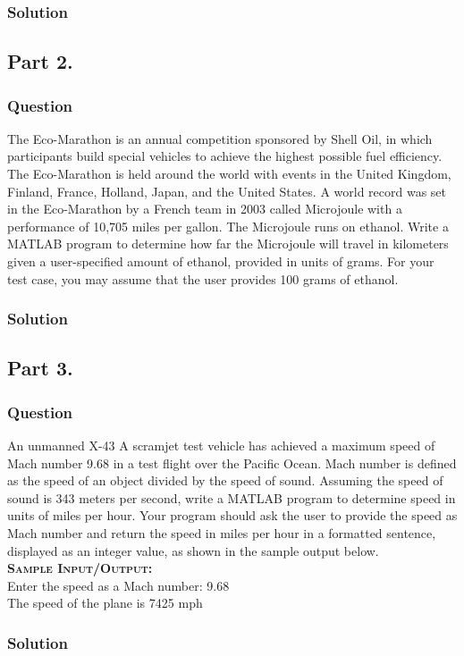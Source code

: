 \documentclass[a4paper, 10pt]{article}
\begin{document}
			\subsubsection{Solution}	
				
				\pagebreak
		\subsection{Part 2.}
			\subsubsection{Question}
				\noindent The Eco-Marathon is an annual competition sponsored by Shell Oil, in which participants build special vehicles to achieve the highest possible 
				fuel efficiency. The Eco-Marathon is held around the world with events in the United Kingdom, Finland, France, Holland, Japan,
				and the United States. A world record was set in the Eco-Marathon by a French team in 2003 called Microjoule with a performance of 10,705 
				miles per gallon. The Microjoule runs on ethanol. Write a MATLAB program to determine how far the Microjoule will travel in kilometers given a 
				user-specified amount of ethanol, provided in units of grams. For your test case, you may assume that the user provides 100 grams of ethanol.
			\subsubsection{Solution}
				
				\pagebreak
		\subsection{Part 3.}
			\subsubsection{Question}
				\noindent An unmanned X-43 A scramjet test vehicle has achieved a maximum speed of Mach number 9.68 in a test flight over the Pacific Ocean. Mach 
				number is defined as the speed of an object divided by the speed of sound. Assuming the speed of sound is 343 meters per
				second, write a MATLAB program to determine speed in units of miles per hour. Your program should ask the user to provide the speed as Mach 
				number and return the speed in miles per hour in a formatted sentence, displayed as an integer value, as shown in the sample
				output below. \\
				\hspace{5mm} \textbf{\textsc{Sample Input/Output:}} \\
				\hspace{5mm} Enter the speed as a Mach number: 9.68 \\
				\hspace{5mm} The speed of the plane is 7425 mph
			\subsubsection{Solution}
				
\end{document}
